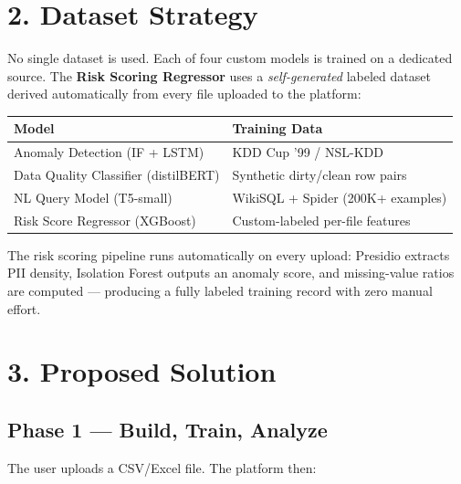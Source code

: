 \documentclass[10pt,twocolumn]{article}
\begin{document}
\section{2. Dataset Strategy}

No single dataset is used. Each of four custom models is trained on a dedicated
source. The \textbf{Risk Scoring Regressor} uses a \textit{self-generated} labeled
dataset derived automatically from every file uploaded to the platform:

\begin{center}
\small
\begin{tabularx}{\columnwidth}{@{}l X@{}}
\toprule
\textbf{Model} & \textbf{Training Data} \\
\midrule
Anomaly Detection (IF + LSTM) & KDD Cup '99 / NSL-KDD \\
Data Quality Classifier (distilBERT) & Synthetic dirty/clean row pairs \\
NL Query Model (T5-small) & WikiSQL + Spider (200K+ examples) \\
Risk Score Regressor (XGBoost) & Custom-labeled per-file features \\
\bottomrule
\end{tabularx}
\end{center}

\noindent The risk scoring pipeline runs automatically on every upload: Presidio
extracts PII density, Isolation Forest outputs an anomaly score, and missing-value
ratios are computed — producing a fully labeled training record with zero manual effort.

\section{3. Proposed Solution}

\subsection{Phase 1 — Build, Train, Analyze}

The user uploads a CSV/Excel file. The platform then:
\end{document}
